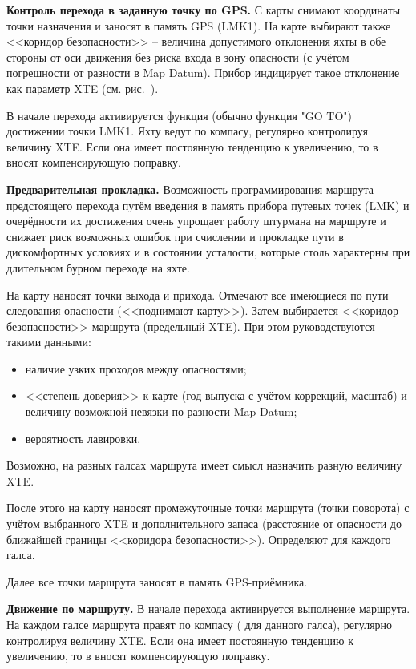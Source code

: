 \textbf{Контроль перехода в заданную точку по GPS.} С карты снимают
координаты точки назначения и заносят в память GPS (LMK1). На карте
выбирают также <<коридор безопасности>> \--- величина допустимого
отклонения яхты в обе стороны от оси движения без риска входа в зону
опасности (с учётом погрешности от разности в Map Datum). Прибор
индицирует такое отклонение как параметр XTE (см. рис.~).

В начале перехода активируется функция (обычно функция "GO TO")
достижении точки LMK1. Яхту ведут по компасу, регулярно контролируя
величину XTE. Если она имеет постоянную тенденцию к увеличению, то в
\KK вносят компенсирующую поправку.

\textbf{Предварительная прокладка.} Возможность программирования
маршрута предстоящего перехода путём введения в память прибора путевых
точек (LMK) и очерёдности их достижения очень упрощает работу штурмана
на маршруте и снижает риск возможных ошибок при счислении и прокладке
пути в дискомфортных условиях и в состоянии усталости, которые столь
характерны при длительном бурном переходе на яхте.

На карту наносят точки выхода и прихода. Отмечают все имеющиеся по
пути следования опасности (<<поднимают карту>>).  Затем выбирается
<<коридор безопасности>> маршрута (предельный XTE). При этом
руководствуются такими данными:

\begin{itemize}
\item наличие узких проходов между опасностями;
\item <<степень доверия>> к карте (год выпуска с учётом коррекций,
  масштаб) и величину возможной невязки по разности Map Datum;
\item вероятность лавировки. 
\end{itemize}

Возможно, на разных галсах маршрута имеет смысл назначить разную
величину XTE.

После этого на карту наносят промежуточные точки маршрута (точки
поворота) с учётом выбранного XTE и дополнительного запаса (расстояние
от опасности до ближайшей границы <<коридора
безопасности>>). Определяют \KK для каждого галса.

Далее все точки маршрута заносят в память GPS-приёмника. 

\textbf{Движение по маршруту.} В начале перехода активируется
выполнение маршрута. На каждом галсе маршрута правят по компасу (\KK
для данного галса), регулярно контролируя величину XTE. Если она имеет
постоянную тенденцию к увеличению, то в \KK вносят компенсирующую
поправку.

